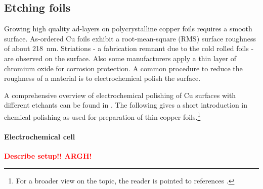 \subsection{Etching foils}
Growing high quality ad-layers on polycrystalline copper foils requires a smooth surface. As-ordered Cu foils exhibit a root-mean-square (RMS) surface roughness of about \SI{218}{\nm}\cite{bin_zhang_low-temperature_2012}. Striations - a fabrication remnant due to the cold rolled foils - are observed on the surface\cite{kim_synthesis_2012-1}. Also some manufacturers apply a thin layer of chromium oxide for corrosion protection\cite{bin_zhang_low-temperature_2012}. A common procedure to reduce the roughness of a material is to electrochemical polish the surface.

A comprehensive overview of  electrochemical polishing of Cu surfaces with different etchants can be found in \cite{jinshan_electrochemical_2004}. The following gives a short introduction in chemical polishing as used for preparation of thin copper foils.\footnote{For a broader view on the topic, the reader is pointed to references \cite{antoine_polishing_1999, lilje_improved_2004, schulz_engeneering_2018}.}

\label{sec:etching}
\paragraph{Electrochemical cell}
\textcolor{red}{\textbf{Describe setup!! ARGH!}}

